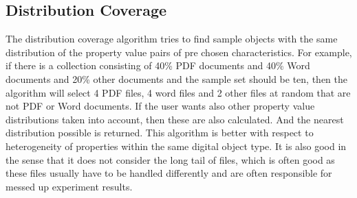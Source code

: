 \subsection{Distribution Coverage}
The distribution coverage algorithm tries to find sample objects with the same distribution of the property value pairs of pre chosen characteristics. For example, if there is a collection consisting of 40\% PDF documents and 40\% Word documents and 20\% other documents and the sample set should be ten, then the algorithm will select 4 PDF files, 4 word files and 2 other files at random that are not PDF or Word documents.
If the user wants also other property value distributions taken into account, then these are also calculated. And the nearest distribution possible is returned.
This algorithm is better with respect to heterogeneity of properties within the same digital object type. It is also good in the sense that it does not consider the long tail of files, which is often good as these files usually have to be handled differently and are often responsible for messed up experiment results.


